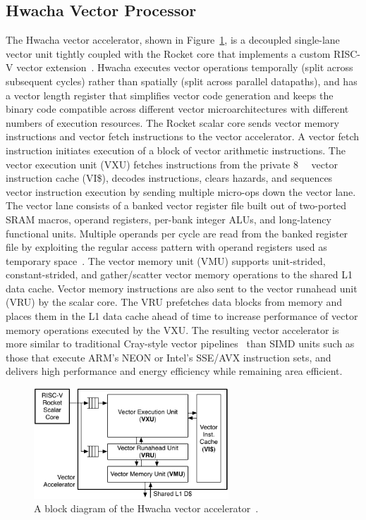 \documentclass[graybox]{svmult}
\begin{document}
\subsection{Hwacha Vector Processor}

The Hwacha vector accelerator, shown in Figure~\ref{fig:6-raven3-hwacha}, is a decoupled single-lane vector unit tightly coupled with the Rocket core that implements a custom RISC-V vector extension~\cite{Lee2014}.
Hwacha executes vector operations temporally (split across subsequent cycles) rather than spatially (split across parallel datapaths), and has a vector length register that simplifies vector code generation and keeps the binary code compatible across different vector microarchitectures with different numbers of execution resources.
The Rocket scalar core sends vector memory instructions and vector fetch instructions to the vector accelerator.
A vector fetch instruction initiates execution of a block of vector arithmetic instructions.
The vector execution unit (VXU) fetches instructions from the private \SI{8}{\kibi\byte} vector instruction cache (VI\$), decodes instructions, clears hazards, and sequences vector instruction execution by sending multiple micro-ops down the vector lane.
The vector lane consists of a banked vector register file built out of two-ported SRAM macros, operand registers, per-bank integer ALUs, and long-latency functional units.
Multiple operands per cycle are read from the banked register file by exploiting the regular access pattern with operand registers used as temporary space~\cite{Lee2014}.
The vector memory unit (VMU) supports unit-strided, constant-strided, and gather/scatter vector memory operations to the shared L1 data cache.
Vector memory instructions are also sent to the vector runahead unit (VRU) by the scalar core.
The VRU prefetches data blocks from memory and places them in the L1 data cache ahead of time to increase performance of vector memory operations executed by the VXU.
The resulting vector accelerator is more similar to traditional Cray-style vector pipelines~\cite{Russel1978} than SIMD units such as those that execute ARM's NEON or Intel's SSE/AVX instruction sets, and delivers high performance and energy efficiency while remaining area efficient.

\begin{figure}
  \centering
  \includegraphics[width=0.65\textwidth]{6-raven3-hwacha}
  \caption{A block diagram of the Hwacha vector accelerator~\cite{Zimmer2016}.}
  \label{fig:6-raven3-hwacha}
\end{figure}
\end{document}
